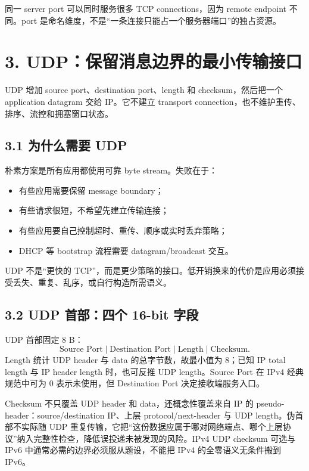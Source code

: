 \documentclass[UTF8,fontset=none,11pt,a4paper]{ctexart}
\providecommand{\tightlist}{\setlength{\itemsep}{0pt}\setlength{\parskip}{0pt}}
\begin{document}
同一 server port 可以同时服务很多 TCP connections，因为 remote endpoint
不同。port 是命名维度，不是``一条连接只能占一个服务器端口''的独占资源。

\section{3.
UDP：保留消息边界的最小传输接口}\label{3-udpux4fddux7559ux6d88ux606fux8fb9ux754cux7684ux6700ux5c0fux4f20ux8f93ux63a5ux53e3}

UDP 增加 source port、destination port、length 和 checksum，然后把一个
application datagram 交给 IP。它不建立 transport
connection，也不维护重传、排序、流控和拥塞窗口状态。

\subsection{3.1 为什么需要
UDP}\label{31-ux4e3aux4ec0ux4e48ux9700ux8981-udp}

朴素方案是所有应用都使用可靠 byte stream。失败在于：

\begin{itemize}
\tightlist
\item
  有些应用需要保留 message boundary；
\item
  有些请求很短，不希望先建立传输连接；
\item
  有些应用要自己控制超时、重传、顺序或实时丢弃策略；
\item
  DHCP 等 bootstrap 流程需要 datagram/broadcast 交互。
\end{itemize}

UDP 不是``更快的
TCP''，而是更少策略的接口。低开销换来的代价是应用必须接受丢失、重复、乱序，或自行构造所需语义。

\subsection{3.2 UDP 首部：四个 16-bit 字段}

UDP 首部固定 8 B：
\[
\boxed{\text{Source Port}\mid\text{Destination Port}\mid\text{Length}\mid\text{Checksum}}.
\]
Length 统计 UDP header 与 data 的总字节数，故最小值为 8；已知 IP total length 与 IP header length 时，也可反推 UDP length。Source Port 在 IPv4 经典规范中可为 0 表示未使用，但 Destination Port 决定接收端服务入口。

Checksum 不只覆盖 UDP header 和 data，还概念性覆盖来自 IP 的 pseudo-header：source/destination IP、上层 protocol/next-header 与 UDP length。伪首部不实际随 UDP 重复传输，它把“这份数据应属于哪对网络端点、哪个上层协议”纳入完整性检查，降低误投递未被发现的风险。IPv4 UDP checksum 可选与 IPv6 中通常必需的边界必须服从题设，不能把 IPv4 的全零语义无条件搬到 IPv6。
\end{document}

